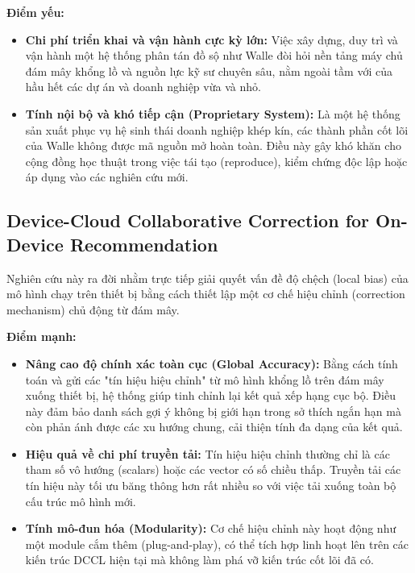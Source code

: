 \textbf{Điểm yếu:}
\begin{itemize}
    \item \textbf{Chi phí triển khai và vận hành cực kỳ lớn:} Việc xây dựng, duy trì và vận hành một hệ thống phân tán đồ sộ như Walle đòi hỏi nền tảng máy chủ đám mây khổng lồ và nguồn lực kỹ sư chuyên sâu, nằm ngoài tầm với của hầu hết các dự án và doanh nghiệp vừa và nhỏ.
    \item \textbf{Tính nội bộ và khó tiếp cận (Proprietary System):} Là một hệ thống sản xuất phục vụ hệ sinh thái doanh nghiệp khép kín, các thành phần cốt lõi của Walle không được mã nguồn mở hoàn toàn. Điều này gây khó khăn cho cộng đồng học thuật trong việc tái tạo (reproduce), kiểm chứng độc lập hoặc áp dụng vào các nghiên cứu mới.
\end{itemize}

\subsection{Device-Cloud Collaborative Correction for On-Device Recommendation \cite{wang2025correction}}

Nghiên cứu này ra đời nhằm trực tiếp giải quyết vấn đề độ chệch (local bias) của mô hình chạy trên thiết bị bằng cách thiết lập một cơ chế hiệu chỉnh (correction mechanism) chủ động từ đám mây.

\textbf{Điểm mạnh:}
\begin{itemize}
    \item \textbf{Nâng cao độ chính xác toàn cục (Global Accuracy):} Bằng cách tính toán và gửi các "tín hiệu hiệu chỉnh" từ mô hình khổng lồ trên đám mây xuống thiết bị, hệ thống giúp tinh chỉnh lại kết quả xếp hạng cục bộ. Điều này đảm bảo danh sách gợi ý không bị giới hạn trong sở thích ngắn hạn mà còn phản ánh được các xu hướng chung, cải thiện tính đa dạng của kết quả.
    \item \textbf{Hiệu quả về chi phí truyền tải:} Tín hiệu hiệu chỉnh thường chỉ là các tham số vô hướng (scalars) hoặc các vector có số chiều thấp. Truyền tải các tín hiệu này tối ưu băng thông hơn rất nhiều so với việc tải xuống toàn bộ cấu trúc mô hình mới.
    \item \textbf{Tính mô-đun hóa (Modularity):} Cơ chế hiệu chỉnh này hoạt động như một module cắm thêm (plug-and-play), có thể tích hợp linh hoạt lên trên các kiến trúc DCCL hiện tại mà không làm phá vỡ kiến trúc cốt lõi đã có.
\end{itemize}

